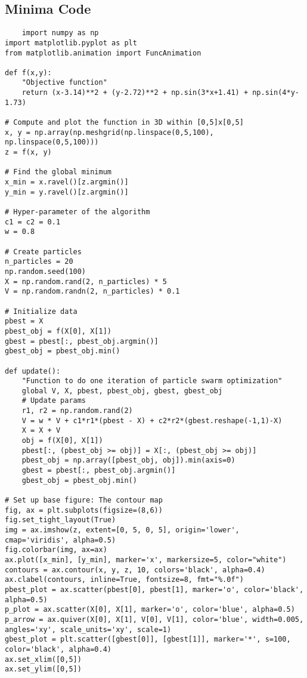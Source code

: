 \documentclass[12pt]{report}
\begin{document}
\subsection{Minima Code}
\begin{verbatim}
    import numpy as np
import matplotlib.pyplot as plt
from matplotlib.animation import FuncAnimation
 
def f(x,y):
    "Objective function"
    return (x-3.14)**2 + (y-2.72)**2 + np.sin(3*x+1.41) + np.sin(4*y-1.73)
    
# Compute and plot the function in 3D within [0,5]x[0,5]
x, y = np.array(np.meshgrid(np.linspace(0,5,100), np.linspace(0,5,100)))
z = f(x, y)
 
# Find the global minimum
x_min = x.ravel()[z.argmin()]
y_min = y.ravel()[z.argmin()]
 
# Hyper-parameter of the algorithm
c1 = c2 = 0.1
w = 0.8
 
# Create particles
n_particles = 20
np.random.seed(100)
X = np.random.rand(2, n_particles) * 5
V = np.random.randn(2, n_particles) * 0.1
 
# Initialize data
pbest = X
pbest_obj = f(X[0], X[1])
gbest = pbest[:, pbest_obj.argmin()]
gbest_obj = pbest_obj.min()
 
def update():
    "Function to do one iteration of particle swarm optimization"
    global V, X, pbest, pbest_obj, gbest, gbest_obj
    # Update params
    r1, r2 = np.random.rand(2)
    V = w * V + c1*r1*(pbest - X) + c2*r2*(gbest.reshape(-1,1)-X)
    X = X + V
    obj = f(X[0], X[1])
    pbest[:, (pbest_obj >= obj)] = X[:, (pbest_obj >= obj)]
    pbest_obj = np.array([pbest_obj, obj]).min(axis=0)
    gbest = pbest[:, pbest_obj.argmin()]
    gbest_obj = pbest_obj.min()
 
# Set up base figure: The contour map
fig, ax = plt.subplots(figsize=(8,6))
fig.set_tight_layout(True)
img = ax.imshow(z, extent=[0, 5, 0, 5], origin='lower', cmap='viridis', alpha=0.5)
fig.colorbar(img, ax=ax)
ax.plot([x_min], [y_min], marker='x', markersize=5, color="white")
contours = ax.contour(x, y, z, 10, colors='black', alpha=0.4)
ax.clabel(contours, inline=True, fontsize=8, fmt="%.0f")
pbest_plot = ax.scatter(pbest[0], pbest[1], marker='o', color='black', alpha=0.5)
p_plot = ax.scatter(X[0], X[1], marker='o', color='blue', alpha=0.5)
p_arrow = ax.quiver(X[0], X[1], V[0], V[1], color='blue', width=0.005, angles='xy', scale_units='xy', scale=1)
gbest_plot = plt.scatter([gbest[0]], [gbest[1]], marker='*', s=100, color='black', alpha=0.4)
ax.set_xlim([0,5])
ax.set_ylim([0,5])
 

\end{verbatim}
\end{document}
